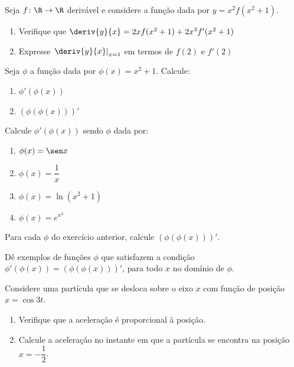 \begin{exercicio}[20]
\label{ex:7.17.20}
Seja $f\colon \R \to \R$ derivável e considere a função dada por $y = x^2 f(x^2 + 1)$.
\begin{enumerate}[label=\alph*)]
    \item Verifique que $\deriv{y}{x} = 2x f(x^2 + 1) + 2x^3 f'(x^2 + 1)$
    \item Expresse $\left.\deriv{y}{x}\right|_{x = 1}$ em termos de $f(2)$ e $f'(2)$
\end{enumerate}
\end{exercicio}

\begin{exercicio}[21]
\label{ex:7.17.21}
Seja $\phi$ a função dada por $\phi(x) = x^2 + 1$. Calcule:
\begin{enumerate}[label=\alph*)]
    \item $\phi'(\phi(x))$
    \item $(\phi(\phi(x)))'$
\end{enumerate}
\end{exercicio}

\begin{exercicio}[22]
\label{ex:7.17.22}
Calcule $\phi'(\phi(x))$ sendo $\phi$ dada por:
\begin{enumerate}[label=\alph*)]
    \item $\phi(x) = \sen x$
    \item $\phi(x) = \dfrac{1}{x}$
    \item $\phi(x) = \ln(x^2 + 1)$
    \item $\phi(x) = e^{x^2}$
\end{enumerate}
\end{exercicio}

\begin{exercicio}[23]
\label{ex:7.17.23}
Para cada $\phi$ do exercício anterior, calcule $(\phi(\phi(x)))'$.
\end{exercicio}

\begin{exercicio}[24]
\label{ex:7.17.24}
Dê exemplos de funções $\phi$ que satisfazem a condição $\phi'(\phi(x)) = (\phi(\phi(x)))'$, para todo $x$ no domínio de $\phi$.
\end{exercicio}

\begin{exercicio}[25]
\label{ex:7.17.25}
Considere uma partícula que se desloca sobre o eixo $x$ com função de posição $x = \cos 3t$.
\begin{enumerate}[label=\alph*)]
    \item Verifique que a aceleração é proporcional à posição.
    \item Calcule a aceleração no instante em que a partícula se encontra na posição $x = -\dfrac{1}{2}$.
\end{enumerate}
\end{exercicio}

